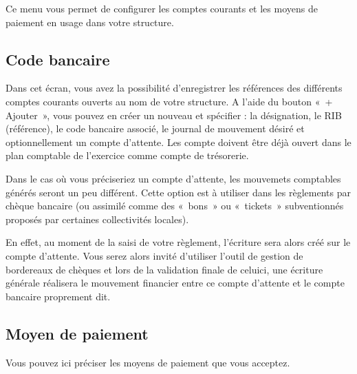 \documentclass[a4paper,10pt,oneside,french]{sphinxmanual}
\begin{document}
\sphinxAtStartPar
Ce menu vous permet de configurer les comptes courants et les moyens de paiement en usage dans votre structure.


\subsection{Code bancaire}
\label{\detokenize{payoff/config:code-bancaire}}
\sphinxAtStartPar
Dans cet écran, vous avez la possibilité d’enregistrer les références des différents comptes courants ouverts au nom de votre structure.
A l’aide du bouton « + Ajouter », vous pouvez en créer un nouveau et spécifier : la désignation, le RIB (référence), le code bancaire associé, le journal de mouvement désiré et optionnellement un compte d’attente.
Les compte doivent être déjà ouvert dans le plan comptable de l’exercice comme compte de trésorerie.

\sphinxAtStartPar
Dans le cas où vous préciseriez un compte d’attente, les mouvemets comptables générés seront un peu différent.
Cette option est à utiliser dans les règlements par chèque bancaire (ou assimilé comme des « bons » ou « tickets » subventionnés proposés par certaines collectivités locales).

\sphinxAtStartPar
En effet, au moment de la saisi de votre règlement, l’écriture sera alors créé sur le compte d’attente.
Vous serez alors invité d’utiliser l’outil de gestion de bordereaux de chèques et lors de la validation finale de celui\sphinxhyphen{}ci,
une écriture générale réalisera le mouvement financier entre ce compte d’attente et le compte bancaire proprement dit.


\subsection{Moyen de paiement}
\label{\detokenize{payoff/config:moyen-de-paiement}}
\sphinxAtStartPar
Vous pouvez ici préciser les moyens de paiement que vous acceptez.
\end{document}
